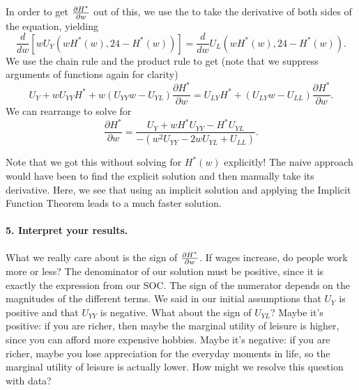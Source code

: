 In order to get $\frac{\partial H^*}{\partial w}$ out of this, we use the  to take the derivative of both sides of the equation, yielding 
$$\frac{d}{d w}\left[w U_{Y}\left(w H^{*}(w), 24-H^{*}(w)\right)\right]=\frac{d}{d w} U_{L}\left(w H^{*}(w), 24-H^{*}(w)\right).$$
We use the chain rule and the product rule to get (note that we suppress arguments of functions again for clarity)
$$U_{Y}+w U_{Y Y} H^{*}+w\left(U_{Y Y} w-U_{Y L}\right) \frac{\partial H^{*}}{\partial w} = U_{L Y} H^{*}+\left(U_{L Y} w-U_{L L}\right) \frac{\partial H^{*}}{\partial w}.$$
We can rearrange to solve for 
$$\boxed{\frac{\partial H^{*}}{\partial w}=\frac{U_{Y}+w H^{*} U_{Y Y}-H^{*} U_{Y L}}{-\left(w^{2} U_{Y Y}-2 w U_{Y L}+U_{L L}\right)}.}$$

Note that we got this without solving for $H^*(w)$ explicitly! The naive approach would have been to find the explicit solution and then manually take its derivative. Here, we see that using an implicit solution and applying the Implicit Function Theorem leads to a much faster solution.

\paragraph{5. Interpret your results.}

What we really care about is the sign of $\frac{\partial H^*}{\partial w}$. If wages increase, do people work more or less? The denominator of our solution must be positive, since it is exactly the expression from our SOC. The sign of the numerator depends on the magnitudes of the different terms. We said in our initial assumptions that $U_Y$ is positive and that $U_{YY}$ is negative. What about the sign of $U_{YL}$? Maybe it's positive: if you are richer, then maybe the marginal utility of leisure is higher, since you can afford more expensive hobbies. Maybe it's negative: if you are richer, maybe you lose appreciation for the everyday moments in life, so the marginal utility of leisure is actually lower. How might we resolve this question with data?

